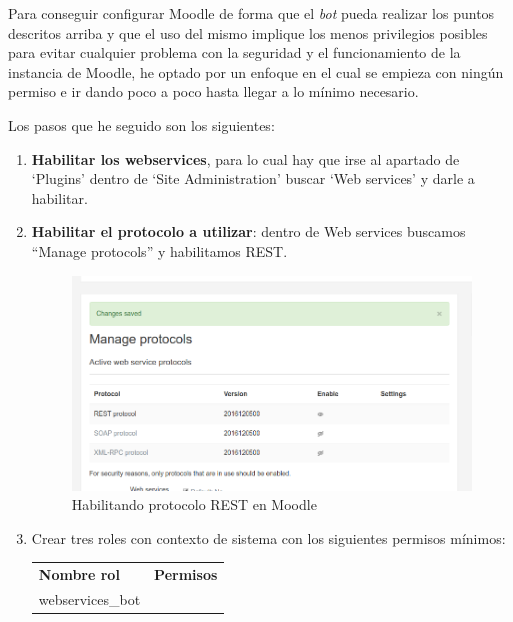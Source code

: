 Para conseguir configurar Moodle de forma que el \textit{bot} pueda realizar los puntos descritos arriba y que el uso del mismo implique los menos privilegios posibles para evitar cualquier problema con la seguridad y el funcionamiento de la instancia de Moodle, he optado por un enfoque en el cual se empieza con ningún permiso e ir dando poco a poco hasta llegar a lo mínimo necesario.
\par
Los pasos que he seguido son los siguientes:
\begin{enumerate}
\item \textbf{Habilitar los webservices}, para lo cual hay que irse al apartado de \enquote*{Plugins} dentro de \enquote*{Site Administration} buscar \enquote*{Web services} y darle a habilitar.

\item \textbf{Habilitar el protocolo a utilizar}: dentro de Web services buscamos \enquote{Manage protocols} y habilitamos REST.
\begin{figure}[H] %
\centering
\includegraphics[scale=0.5]{imagenes/moodle/Screenshot_2017-08-25_10-28-32.png}  %

\caption{Habilitando protocolo REST en Moodle}\label{figura410}
\end{figure}
\item Crear tres roles con contexto de sistema con los siguientes permisos mínimos:


\begin{tabular}{|p{5cm}|p{8cm}|}
\hline
\textbf{Nombre rol}
\newline

 &
 
\textbf{Permisos}
  \\
webservices\_bot
\newline


\end{tabular}
\end{enumerate}
